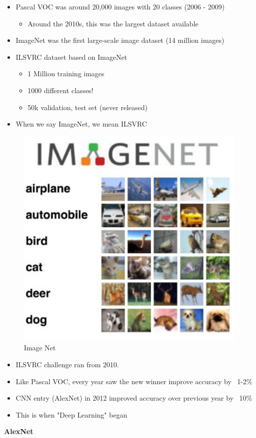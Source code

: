 \begin{itemize}
    \item Pascal VOC was around 20,000 images with 20 classes (2006 - 2009)
    \begin{itemize}
        \item Around the 2010s, this was the largest dataset available
    \end{itemize}
    \item ImageNet was the first large-scale image dataset (14 million images)
    \item ILSVRC dataset based on ImageNet
    \begin{itemize}
        \item 1 Million training images
    \end{itemize}
    \begin{itemize}
        \item 1000 different classes!
    \end{itemize}
    \begin{itemize}
        \item 50k validation, test set (never released)
    \end{itemize}
    \item When we say ImageNet, we mean ILSVRC
\end{itemize}

\begin{figure}[h!t]
    \centering
    \includegraphics[width=0.225\linewidth]{imagenet.png}
    \caption{Image Net}
    \label{fig:enter-label}
\end{figure}

\begin{itemize}
    \item ILSVRC challenge ran from 2010.
    \item Like Pascal VOC, every year saw the new winner improve accuracy by ~1-2\%
    \item CNN entry (AlexNet) in 2012 improved accuracy over previous year by ~10\%
    \item This is when "Deep Learning" began
\end{itemize}

\textbf{AlexNet}

